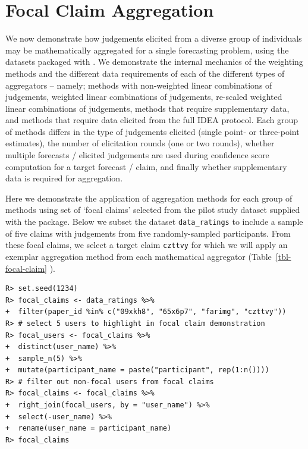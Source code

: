 \documentclass[article]{jss}
\begin{document}
\hypertarget{focal-claim-aggregation}{%
\section{Focal Claim Aggregation}\label{focal-claim-aggregation}}

We now demonstrate how judgements elicited from a diverse group of
individuals may be mathematically aggregated for a single forecasting
problem, using the datasets packaged with . We demonstrate
the internal mechanics of the weighting methods and the different data
requirements of each of the different types of aggregators -- namely;
methods with non-weighted linear combinations of judgements, weighted
linear combinations of judgements, re-scaled weighted linear
combinations of judgements, methods that require supplementary data, and
methods that require data elicited from the full IDEA protocol. Each
group of methods differs in the type of judgements elicited (single
point- or three-point estimates), the number of elicitation rounds (one
or two rounds), whether multiple forecasts / elicited judgements are
used during confidence score computation for a target forecast / claim,
and finally whether supplementary data is required for aggregation.

Here we demonstrate the application of aggregation methods for each
group of methods using set of `focal claims' selected from the pilot
study dataset supplied with the  package. Below we subset
the dataset \texttt{data\_ratings} to include a sample of five claims
with judgements from five randomly-sampled participants. From these
focal claims, we select a target claim \texttt{czttvy} for which we will
apply an exemplar aggregation method from each mathematical aggregator
(Table~\ref{tbl-focal-claim} ).

\begin{verbatim}
R> set.seed(1234)
R> focal_claims <- data_ratings %>% 
+  filter(paper_id %in% c("09xkh8", "65x6p7", "farimg", "czttvy"))
R> # select 5 users to highlight in focal claim demonstration
R> focal_users <- focal_claims %>% 
+  distinct(user_name) %>% 
+  sample_n(5) %>% 
+  mutate(participant_name = paste("participant", rep(1:n())))
R> # filter out non-focal users from focal claims
R> focal_claims <- focal_claims %>%  
+  right_join(focal_users, by = "user_name") %>% 
+  select(-user_name) %>% 
+  rename(user_name = participant_name)
R> focal_claims
\end{verbatim}
\end{document}
